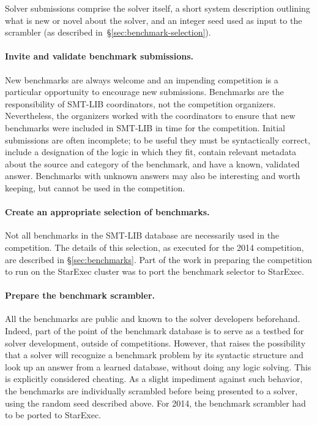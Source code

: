 \documentclass[twoside,11pt]{article}
\begin{document}
Solver submissions comprise the solver itself, a short system
description outlining what is new or novel about the solver, and an
integer seed used as input to the scrambler (as described
in~\S\ref{sec:benchmark-selection}).

\paragraph{Invite and validate benchmark submissions.} New benchmarks are always welcome and an impending competition is a particular opportunity to encourage new submissions. Benchmarks are the responsibility of SMT-LIB coordinators, not the competition organizers. Nevertheless, the organizers worked with the coordinators to ensure that new benchmarks were included in SMT-LIB in time for the competition. Initial submissions are often incomplete; to be useful they must be syntactically correct, include a designation of the logic in which they fit, contain relevant metadata about the source and category of the benchmark, and have a known, validated answer. Benchmarks with unknown answers may also be interesting and worth keeping, but cannot be used in the competition.

\paragraph{Create an appropriate selection of benchmarks.} Not all benchmarks in the SMT-LIB database are necessarily used in the competition. The details of this selection, as executed for the 2014 competition, are described in \S\ref{sec:benchmarks}. Part of the work in preparing the competition to run on the StarExec cluster was to port the benchmark selector to StarExec.

\paragraph{Prepare the benchmark scrambler.} All the benchmarks are public and known to the solver developers beforehand. Indeed, part of the point of the benchmark database is to serve as a testbed for solver development, outside of competitions. However, that raises the possibility that a solver will recognize a benchmark problem by its syntactic structure and look up an answer from a learned database, without doing any logic solving. This is explicitly considered cheating. As a slight impediment against such behavior, the benchmarks are individually scrambled before being presented to a solver, using the random seed described above. For 2014, the benchmark scrambler had to be ported to StarExec.
\end{document}
